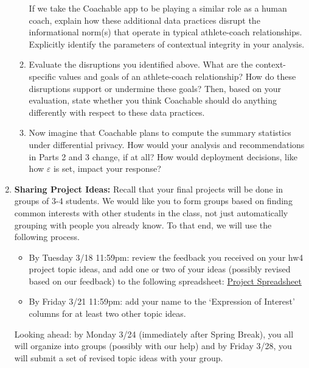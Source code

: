 \documentclass[11pt]{article}
\begin{document}
\begin{enumerate}[leftmargin=*]
\begin{enumerate}
    If we take the Coachable app to be playing a similar role as a human coach, explain how these additional data practices disrupt the informational norm(s) that operate in typical athlete-coach relationships. Explicitly identify the parameters of contextual integrity in your analysis.

    \item Evaluate the disruptions you identified above. What are the context-specific values and goals of an athlete-coach relationship? How do these disruptions support or undermine these goals? Then, based on your evaluation, state whether you think Coachable should do anything differently with respect to these data practices. 

    \item Now imagine that Coachable plans to compute the summary statistics under differential privacy. How would your analysis and recommendations in Parts 2 and 3 change, if at all? How would deployment decisions, like how $\varepsilon$ is set, impact your response?

    \end{enumerate}

\item \textbf{Sharing Project Ideas:}
Recall that your final projects will be done in groups of 3-4 students. We would like you to form groups based on finding common interests with other students in the class, not just automatically grouping with people you already know. To that end, we will use the following process.
\begin{itemize}
    \item By Tuesday 3/18 11:59pm: review the feedback you received on your hw4 project topic ideas, and add one or two of your ideas (possibly revised based on our feedback) to the following spreadsheet: \href{https://docs.google.com/spreadsheets/d/1gxPtxZU835YJ_yZbDQtneGnusvXHWax4sDi-fodu2wA/edit?gid=0#gid=0}{Project Spreadsheet} 
    \item By Friday 3/21 11:59pm: add your name to the `Expression of Interest' columns for at least two other topic ideas.
\end{itemize}

Looking ahead: by Monday 3/24 (immediately after Spring Break), you all will organize into groups (possibly with our help) and by Friday 3/28, you will submit a set of revised topic ideas with your group.
\end{enumerate}
\end{document}
